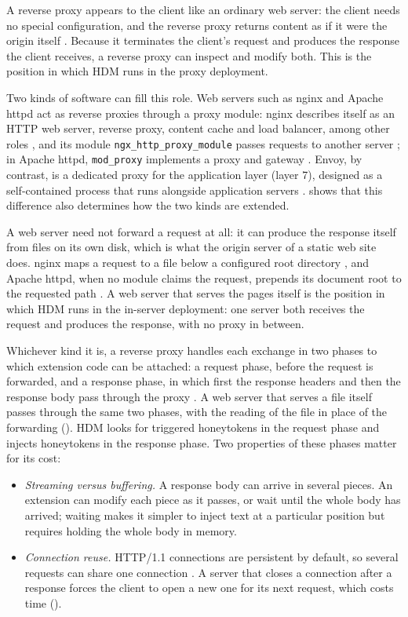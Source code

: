 \documentclass{rptuma}
\begin{document}
A reverse proxy appears to the client like an ordinary web server: the client needs no special
configuration, and the reverse proxy returns content as if it were the origin itself
\cite{apache_modproxy}. Because it terminates the client's request and produces the response the
client receives, a reverse proxy can inspect and modify both. This is the position in which HDM
runs in the proxy deployment.

Two kinds of software can fill this role. Web servers such as nginx and Apache httpd act as
reverse proxies through a proxy module: nginx describes itself as an HTTP web server,
reverse proxy, content cache and load balancer, among other roles \cite{nginx_about}, and its module
\texttt{ngx\_http\_proxy\_module} passes requests to another server \cite{nginx_proxy}; in Apache
httpd, \texttt{mod\_proxy} implements a proxy and gateway \cite{apache_modproxy}. Envoy, by
contrast, is a dedicated proxy for the application layer (layer 7), designed as a self-contained
process that runs alongside application servers \cite{envoy_what}. 
shows that this difference also determines how the two kinds are extended.

A web server need not forward a request at all: it can produce the response itself from files on its
own disk, which is what the origin server of a static web site does. nginx maps a request to a file
below a configured root directory \cite{nginx_core}, and Apache httpd, when no module claims the
request, prepends its document root to the requested path \cite{apache_request}. A web server that
serves the pages itself is the position in which HDM runs in the in-server deployment: one server
both receives the request and produces the response, with no proxy in between.

Whichever kind it is, a reverse proxy handles each exchange in two phases to which extension
code can be attached: a request phase, before the request is forwarded, and a response phase, in
which first the response headers and then the response body pass through the proxy
\cite{envoy_httpfilters,luanginx}. A web server that serves a file itself passes through the same
two phases, with the reading of the file in place of the forwarding
(). HDM looks for triggered honeytokens in the request phase and
injects honeytokens in the response phase. Two properties of these phases matter for its cost:
\begin{itemize}
  \item \emph{Streaming versus buffering.} A response body can arrive in several pieces. An
    extension can modify each piece as it passes, or wait until the whole body has arrived;
    waiting makes it simpler to inject text at a particular position but requires holding the
    whole body in memory.
  \item \emph{Connection reuse.} HTTP/1.1 connections are persistent by default, so several
    requests can share one connection \cite{rfc9112}. A server that closes a connection after a
    response forces the client to open a new one for its next request, which costs time
    ().
\end{itemize}
\end{document}
